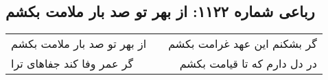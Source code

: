 \begin{center}
\section*{رباعی شماره ۱۱۲۲: از بهر تو صد بار ملامت بکشم}
\label{sec:1122}
\begin{longtable}{l p{0.5cm} r}
از بهر تو صد بار ملامت بکشم
&&
گر بشکنم این عهد غرامت بکشم
\\
گر عمر وفا کند جفاهای ترا
&&
در دل دارم که تا قیامت بکشم
\\
\end{longtable}
\end{center}

